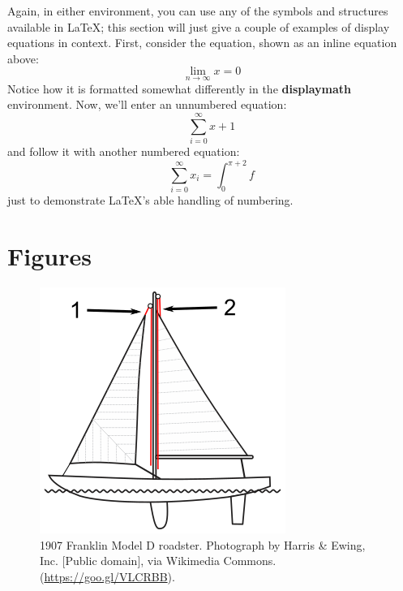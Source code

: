 \documentclass[sigconf]{acmart}
\begin{document}
Again, in either environment, you can use any of the symbols and
structures available in \LaTeX\@; this section will just give a couple
of examples of display equations in context.  First, consider the
equation, shown as an inline equation above:
\begin{equation}
  \lim_{n\rightarrow \infty}x=0
\end{equation}
Notice how it is formatted somewhat differently in
the \textbf{displaymath}
environment.  Now, we'll enter an unnumbered equation:
\begin{displaymath}
  \sum_{i=0}^{\infty} x + 1
\end{displaymath}
and follow it with another numbered equation:
\begin{equation}
  \sum_{i=0}^{\infty}x_i=\int_{0}^{\pi+2} f
\end{equation}
just to demonstrate \LaTeX's able handling of numbering.

\section{Figures}

\begin{figure}[h]
  \centering
  \includegraphics[width=\linewidth]{img/Halyard}
  \caption{1907 Franklin Model D roadster. Photograph by Harris \&
    Ewing, Inc. [Public domain], via Wikimedia
    Commons. (\url{https://goo.gl/VLCRBB}).}
\end{figure}
\end{document}
